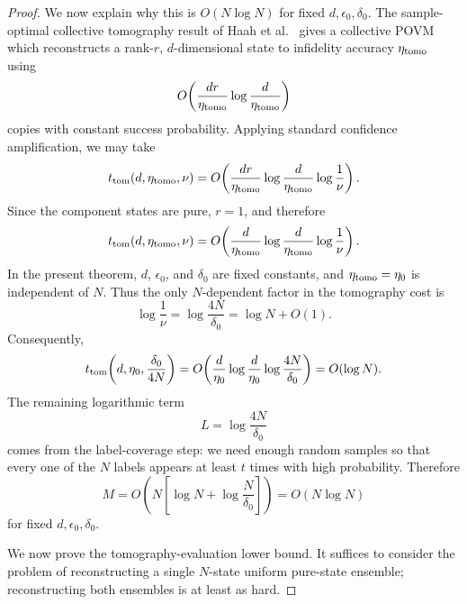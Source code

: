 \documentclass[aps,prx,reprint,superscriptaddress,amsmath,amssymb,longbibliography,floatfix]{revtex4-2}
\theoremstyle{plain}
\theoremstyle{definition}
\theoremstyle{remark}
\begin{document}
\begin{proof}
We now explain why this is \(O(N\log N)\) for fixed
\(d,\epsilon_0,\delta_0\). The sample-optimal collective tomography result of
Haah et al.~\cite{sample_optimal_tomography_7956181} gives a collective POVM
which reconstructs a rank-\(r\), \(d\)-dimensional state to infidelity accuracy
\(\eta_{\rm tomo}\) using
\[
    O\!\left(
        \frac{dr}{\eta_{\rm tomo}}
        \log\frac{d}{\eta_{\rm tomo}}
    \right)
\]
copies with constant success probability. Applying standard confidence
amplification, we may take
\[
    t_{\rm tom}(d,\eta_{\rm tomo},\nu)
    =
    O\!\left(
        \frac{dr}{\eta_{\rm tomo}}
        \log\frac{d}{\eta_{\rm tomo}}
        \log\frac1\nu
    \right).
\]
Since the component states are pure, \(r=1\), and therefore
\begin{equation}
    t_{\rm tom}(d,\eta_{\rm tomo},\nu)
    =
    O\!\left(
        \frac{d}{\eta_{\rm tomo}}
        \log\frac{d}{\eta_{\rm tomo}}
        \log\frac1\nu
    \right).
\label{eq:app-pure-state-tomography-cost}
\end{equation}
In the present theorem, \(d\), \(\epsilon_0\), and \(\delta_0\) are fixed
constants, and \(\eta_{\rm tomo}=\eta_0\) is independent of \(N\). Thus the only
\(N\)-dependent factor in the tomography cost is
\[
    \log\frac1\nu
    =
    \log\frac{4N}{\delta_0}
    =
    \log N+O(1).
\]
Consequently,
\[
    t_{\rm tom}\!\left(d,\eta_0,\frac{\delta_0}{4N}\right)
    =
    O\!\left(
        \frac{d}{\eta_0}
        \log\frac{d}{\eta_0}
        \log\frac{4N}{\delta_0}
    \right)
    =
    O(\log N).
\]
The remaining logarithmic term
\[
    L=\log\frac{4N}{\delta_0}
\]
comes from the label-coverage step: we need enough random samples so that every
one of the \(N\) labels appears at least \(t\) times with high probability.
Therefore
\begin{equation}
    M
    =
    O\!\left(
        N\left[
            \log N
            +
            \log\frac{N}{\delta_0}
        \right]
    \right)
    =
    O(N\log N)
\label{eq:app-tomography-upper-complexity}
\end{equation}
for fixed \(d,\epsilon_0,\delta_0\).

We now prove the tomography-evaluation lower bound. It suffices to consider the
problem of reconstructing a single \(N\)-state uniform pure-state ensemble;
reconstructing both ensembles is at least as hard.


\end{proof}
\end{document}
